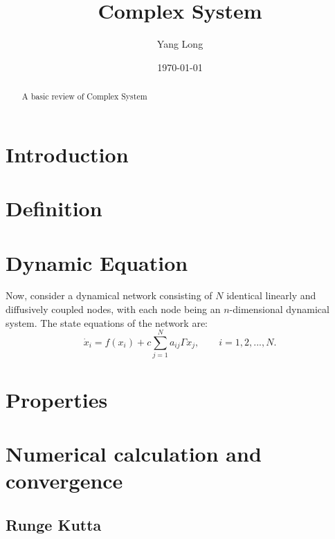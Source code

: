 \documentclass[%
 reprint,
 amsmath,amssymb,
 aps,
rmp,
]{revtex4-1}
\begin{document}

\title{Complex System}%

\author{Yang Long}

\date{\today}

\begin{abstract}
A basic review of Complex System
\end{abstract}

\maketitle

\section{Introduction}

\section{Definition}

\section{Dynamic Equation}
Now, consider a dynamical network consisting of $N$ identical linearly and diffusively coupled nodes, with each node being an $n$-dimensional dynamical system. The state equations of the network are:
\begin{equation}
\dot{x}_i = f(x_i) + c \sum_{j=1}^{N} a_{ij} \Gamma x_j,\qquad i = 1,2,...,N.
\label{eq:lineardynamicequation}
\end{equation}

\section{Properties}

\section{Numerical calculation and convergence}

\subsection{Runge Kutta}
\end{document}
